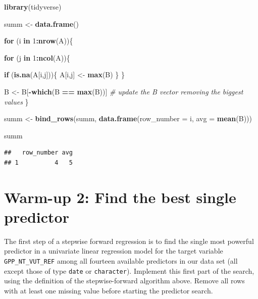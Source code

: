 \documentclass[
]{book}
\newenvironment{Shaded}{\begin{snugshade}}{\end{snugshade}}
\newcommand{\CommentTok}[1]{\textcolor[rgb]{0.56,0.35,0.01}{\textit{#1}}}
\newcommand{\ControlFlowTok}[1]{\textcolor[rgb]{0.13,0.29,0.53}{\textbf{#1}}}
\newcommand{\DataTypeTok}[1]{\textcolor[rgb]{0.13,0.29,0.53}{#1}}
\newcommand{\DecValTok}[1]{\textcolor[rgb]{0.00,0.00,0.81}{#1}}
\newcommand{\KeywordTok}[1]{\textcolor[rgb]{0.13,0.29,0.53}{\textbf{#1}}}
\newcommand{\NormalTok}[1]{#1}
\newcommand{\OperatorTok}[1]{\textcolor[rgb]{0.81,0.36,0.00}{\textbf{#1}}}
\newcommand{\StringTok}[1]{\textcolor[rgb]{0.31,0.60,0.02}{#1}}
\begin{document}
\begin{Shaded}
\begin{Highlighting}[]
\KeywordTok{library}\NormalTok{(tidyverse)}

\NormalTok{summ <-}\StringTok{ }\KeywordTok{data.frame}\NormalTok{()}

\ControlFlowTok{for}\NormalTok{ (i }\ControlFlowTok{in} \DecValTok{1}\OperatorTok{:}\KeywordTok{nrow}\NormalTok{(A))\{}
  
  \ControlFlowTok{for}\NormalTok{ (j }\ControlFlowTok{in} \DecValTok{1}\OperatorTok{:}\KeywordTok{ncol}\NormalTok{(A))\{}
    
    \ControlFlowTok{if}\NormalTok{ (}\KeywordTok{is.na}\NormalTok{(A[i,j]))\{}
\NormalTok{      A[i,j] <-}\StringTok{ }\KeywordTok{max}\NormalTok{(B)}
\NormalTok{    \}}
\NormalTok{  \}}
  

\NormalTok{  B <-}\StringTok{ }\NormalTok{B[}\OperatorTok{-}\KeywordTok{which}\NormalTok{(B }\OperatorTok{==}\StringTok{ }\KeywordTok{max}\NormalTok{(B))] }\CommentTok{# update the B vector removing the biggest values}
\NormalTok{\}}

\NormalTok{  summ <-}\StringTok{ }\KeywordTok{bind_rows}\NormalTok{(summ, }\KeywordTok{data.frame}\NormalTok{(}\DataTypeTok{row_number =}\NormalTok{ i, }\DataTypeTok{avg =} \KeywordTok{mean}\NormalTok{(B)))}
  
\NormalTok{summ}
\end{Highlighting}
\end{Shaded}

\begin{verbatim}
##   row_number avg
## 1          4   5
\end{verbatim}

\hypertarget{warm-up-2-find-the-best-single-predictor}{%
\section{Warm-up 2: Find the best single predictor}\label{warm-up-2-find-the-best-single-predictor}}

The first step of a stepwise forward regression is to find the single most powerful predictor in a univariate linear regression model for the target variable \texttt{GPP\_NT\_VUT\_REF} among all fourteen available predictors in our data set (all except those of type \texttt{date} or \texttt{character}). Implement this first part of the search, using the definition of the stepwise-forward algorithm above. Remove all rows with at least one missing value before starting the predictor search.
\end{document}

